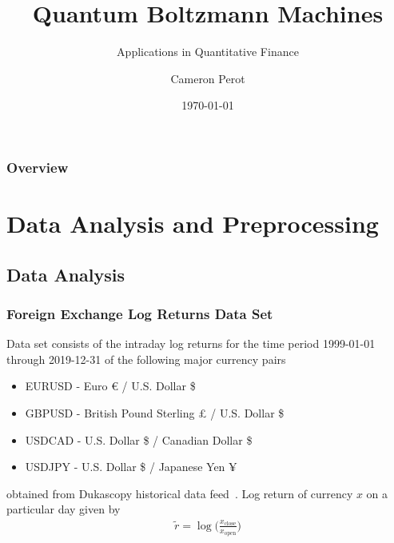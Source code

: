 \documentclass{beamer}
\title{Quantum Boltzmann Machines}
\subtitle{Applications in Quantitative Finance}
\author{Cameron Perot}
\institute{JSC}
\date{\today}
\begin{document}

\maketitle


\begin{frame}
    \frametitle{Overview}
    \tableofcontents
\end{frame}


\section{Data Analysis and Preprocessing}

\subsection{Data Analysis}
\begin{frame}
    \frametitle{Foreign Exchange Log Returns Data Set}
    Data set consists of the intraday log returns for the time period 1999-01-01 through 2019-12-31 of the following major currency pairs
    \begin{itemize}
        \item EURUSD - Euro € / U.S. Dollar \$
        \item GBPUSD - British Pound Sterling £ / U.S. Dollar \$
        \item USDCAD - U.S. Dollar \$ / Canadian Dollar \$
        \item USDJPY - U.S. Dollar \$ / Japanese Yen ¥
    \end{itemize}
    obtained from Dukascopy historical data feed~\cite{dukascopy}.
    Log return of currency \( x \) on a particular day given by
    \begin{align}
        \tilde{r}
            = \log\bigg( \frac{x_\text{close}}{x_\text{open}} \bigg)
    \end{align}
\end{frame}
\end{document}
